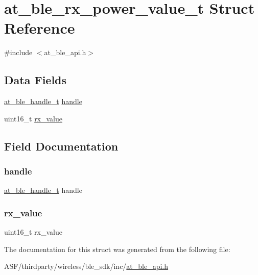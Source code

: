 \hypertarget{structat__ble__rx__power__value__t}{}\section{at\+\_\+ble\+\_\+rx\+\_\+power\+\_\+value\+\_\+t Struct Reference}
\label{structat__ble__rx__power__value__t}


{\ttfamily \#include $<$at\+\_\+ble\+\_\+api.\+h$>$}

\subsection*{Data Fields}
\begin{DoxyCompactItemize}
\item 
\mbox{\hyperlink{at__ble__api_8h_abd23646d0c662860741f787efc8456f2}{at\+\_\+ble\+\_\+handle\+\_\+t}} \mbox{\hyperlink{structat__ble__rx__power__value__t_ab8b0f353cb6a8d85f0822900e3b7cf35}{handle}}
\item 
uint16\+\_\+t \mbox{\hyperlink{structat__ble__rx__power__value__t_adc787b602946eece440b7e924f6846ec}{rx\+\_\+value}}
\end{DoxyCompactItemize}


\subsection{Field Documentation}
\mbox{\label{structat__ble__rx__power__value__t_ab8b0f353cb6a8d85f0822900e3b7cf35}} 
\subsubsection{\texorpdfstring{handle}{handle}}
{\footnotesize\ttfamily \mbox{\hyperlink{at__ble__api_8h_abd23646d0c662860741f787efc8456f2}{at\+\_\+ble\+\_\+handle\+\_\+t}} handle}

\mbox{\label{structat__ble__rx__power__value__t_adc787b602946eece440b7e924f6846ec}} 
\subsubsection{\texorpdfstring{rx\_value}{rx\_value}}
{\footnotesize\ttfamily uint16\+\_\+t rx\+\_\+value}



The documentation for this struct was generated from the following file\+:\begin{DoxyCompactItemize}
\item 
A\+S\+F/thirdparty/wireless/ble\+\_\+sdk/inc/\mbox{\hyperlink{at__ble__api_8h}{at\+\_\+ble\+\_\+api.\+h}}\end{DoxyCompactItemize}
